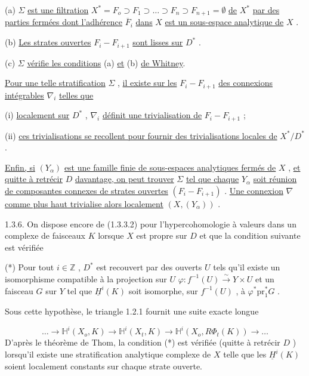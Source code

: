 (a) $\Sigma$ \underline{est une filtration} $X^* = F_o \supset F_1 \supset \ldots \supset F_n \supset F_{n+1} = \emptyset$ \underline{de} $X^*$ \underline{par des parties fermées dont l'adhérence} $\overline{F}_i$ \underline{dans} $X$ \underline{est un sous-espace analytique de} $X$ .



(b) \underline{Les strates ouvertes} $F_i - F_{i+1}$ \underline{sont lisses sur} $D^*$ .

(c) $\Sigma$ \underline{vérifie les conditions} (a) \underline{et} (b) \underline{de Whitney}.

\underline{Pour une telle stratification} $\Sigma$ , \underline{il existe sur les} $F_i - F_{i+1}$ \underline{des connexions intégrables} $\nabla_i$ \underline{telles que}

(i) \underline{localement sur} $D^*$ , $\nabla_i$ \underline{définit une trivialisation de} $F_i - F_{i+1}$ ;

(ii) \underline{ces trivialisations se recollent pour fournir des trivialisations locales de} $X^*/D^*$ .

\underline{Enfin, si} $(Y_\alpha)$ \underline{est une famille finie de sous-espaces analytiques fermés de} $X$ , \underline{et quitte à retrécir} $D$ \underline{davantage, on peut trouver} $\Sigma$ \underline{tel que chaque} $Y_\alpha$ \underline{soit réunion de composantes connexes de strates ouvertes} $(F_i - F_{i+1})$ . \underline{Une connexion} $\nabla$ \underline{comme plus haut trivialise alors localement} $(X, (Y_\alpha))$ .

1.3.6. On dispose encore de (1.3.3.2) pour l'hypercohomologie à valeurs dans un complexe de faisceaux $K$ lorsque $X$ est propre sur $D$ et que la condition suivante est vérifiée

(*) Pour tout $i \in \mathbb{Z}$ , $D^*$ est recouvert par des ouverts $U$ tels qu'il existe un isomorphisme compatible à la projection sur $U$ $\varphi : f^{-1}(U) \xrightarrow{\sim} Y \times U$ et un faisceau $G$ sur $Y$ tel que $\underline{H}^i(K)$ soit isomorphe, sur $f^{-1}(U)$ , à $\varphi^* \mathrm{pr}_1^* G$ .

Sous cette hypothèse, le triangle 1.2.1 fournit une suite exacte longue

\begin{equation}\tag{1.3.6.1}
\ldots \longrightarrow \mathbb{H}^i(X_o, K) \longrightarrow \mathbb{H}^i(X_t, K) \longrightarrow \mathbb{H}^i(X_o, R\Phi_t(K)) \longrightarrow \ldots
\end{equation}
D'après le théorème de Thom, la condition (*) est vérifiée (quitte à retrécir $D$ ) lorsqu'il existe une stratification analytique complexe de $X$ telle que les $\underline{H}^i(K)$ soient localement constants sur chaque strate ouverte.


